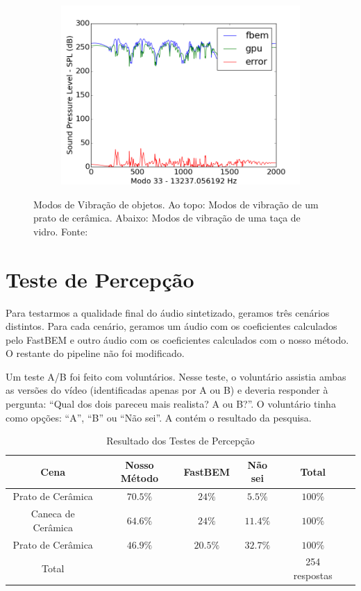 \begin{figure}[ht]
\begin{subfigure}{0.5\textwidth}
	\includegraphics[width=\textwidth]{../data/transfer_test/ceramic_plate/plots/ceramic_plate-tfv-0_33.png}
	\label{fig:coef_plate_33}
\end{subfigure}
\caption[Modos de Vibração de objetos]{Modos de Vibração de objetos. Ao topo: Modos de vibração de um prato de cerâmica. Abaixo: Modos de vibração de uma taça de vidro. Fonte: \cite{langlois2014eigenmode}}
\label{fig:coef_plate}
\end{figure}


\section{Teste de Percepção}

Para testarmos a qualidade final do áudio sintetizado, geramos três cenários distintos. Para cada cenário, geramos um áudio com os coeficientes calculados pelo FastBEM e outro áudio com os coeficientes calculados com o nosso método. O restante do pipeline não foi modificado.

Um teste A/B foi feito com voluntários. Nesse teste, o voluntário assistia ambas as versões do vídeo (identificadas apenas por A ou B) e deveria responder à pergunta: ``Qual dos dois pareceu mais realista? A ou B?''. O voluntário tinha como opções: ``A'', ``B'' ou ``Não sei''. A  contém o resultado da pesquisa.

\begin{table}[ht]
\begin{center}
\begin{tabular}{c|ccccc}
Cena & Nosso Método & FastBEM & Não sei & Total\\
\hline Prato de Cerâmica & $70.5\%$ & $24\%$ & $5.5\%$ & $100\%$\\
Caneca de Cerâmica & $64.6\%$ & $24\%$ & $11.4\%$ & $100\%$\\
Prato de Cerâmica & $46.9\%$ & $20.5\%$ & $32.7\%$ & $100\%$\\
Total & & & & 254 respostas
\end{tabular}
\end{center}
\caption{Resultado dos Testes de Percepção}\label{tab:survey_results}
\end{table}



